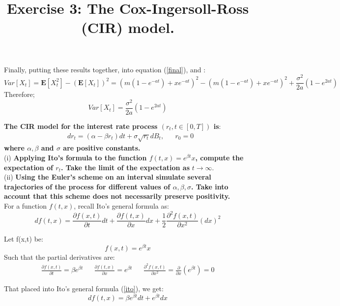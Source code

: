 \documentclass[12pt]{article}
\begin{document}
Finally, putting these results together, into equation (\ref{final}), and :
\begin{equation}
Var[X_t] =  \mathbf{E}[X_t^2]-(\mathbf{E}[X_t])^2 = (m(1-e^{-at}) + x e^{-at} )^2 - (m(1-e^{-at}) + x e^{-at} )^2+ \frac{\sigma^2}{2a} (1-e^{2at})
\end{equation}
Therefore;
\begin{equation}
\boxed{Var[X_t] =   \frac{\sigma^2}{2a} (1-e^{2at})}
\end{equation}


\pagebreak


\title {{\bf Exercise 3:} {\bf The Cox-Ingersoll-Ross (CIR) model. }}
{\bf The CIR model for the interest rate process $(r_t, t\in[0,T])$ is}:
\begin{align*}
& dr_t = (\alpha - \beta r_t)dt + \sigma \sqrt{r_t}dB_t, && r_0=0
\end{align*} 
{\bf where $\alpha, \beta$ and $\sigma$ are positive constants.} \\

(i) {\bf Applying Ito's formula to the function $f(t,x)=e^{\beta t} x$, compute the expectation of $r_t$. Take the limit of the expectation as} $t\longrightarrow \infty$.\\

(ii) {\bf Using the Euler's scheme on an interval simulate several trajectories of the process for different values of $\alpha, \beta,\sigma$. Take into account that this scheme does not necessarily preserve positivity.} \\

For a function $f(t,x)$, recall Ito's general formula as:
\begin{equation}\label{ito}
df(t,x) = \frac{\partial f(x,t)}{\partial t} dt + \frac{\partial f(t,x)}{\partial x}dx + \frac{1}{2}\frac{\partial^2f(x,t)}{\partial x^2}(dx)^2
\end{equation}

Let f(x,t) be:
\begin{equation}
f(x,t)= e^{\beta t}x
\end{equation}
Such that the partial derivatives are:
\begin{align}
 \frac{\partial f(x,t)}{\partial t}= \beta e^{\beta t} &&
 \frac{\partial f(t,x)}{\partial x} = e^{\beta t} &&
 \frac{\partial^2f(x,t)}{\partial x^2} = \frac{\partial}{\partial x} (e^{\beta t}) = 0 
\end{align}

That placed into Ito's general formula (\ref{ito}), we get:
\begin{equation}
df(t,x) =  \beta e^{\beta t}dt + e^{\beta t} dx 
\end{equation}
\end{document}

